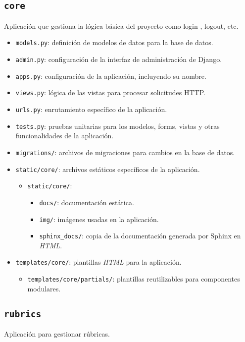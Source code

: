 \subsection{\texttt{core}}
Aplicación que gestiona la lógica básica del proyecto como login , logout, etc. 

\begin{itemize}
    \item \texttt{models.py}: definición de modelos de datos para la base de datos.
    \item \texttt{admin.py}: configuración de la interfaz de administración de Django.
    \item \texttt{apps.py}: configuración de la aplicación, incluyendo su nombre.
    \item \texttt{views.py}: lógica de las vistas para procesar solicitudes HTTP.
    \item \texttt{urls.py}: enrutamiento específico de la aplicación.
    \item \texttt{tests.py}: pruebas unitarias para los modelos, forms, vistas y otras funcionalidades de la aplicación.
    \item \texttt{migrations/}: archivos de migraciones para cambios en la base de datos.
    \item \texttt{static/core/}: archivos estáticos específicos de la aplicación.
    \begin{itemize}
        \item \texttt{static/core/}:
        \begin{itemize}
            \item \texttt{docs/}: documentación estática.
            \item \texttt{img/}: imágenes usadas en la aplicación.
            \item \texttt{sphinx\_docs/}: copia de la documentación generada por Sphinx en \textit{HTML}.
        \end{itemize}
    \end{itemize}
    \item \texttt{templates/core/}: plantillas \textit{HTML} para la aplicación.
    \begin{itemize}
        \item \texttt{templates/core/partials/}: plantillas reutilizables para componentes modulares.
    \end{itemize}
\end{itemize}

\subsection{\texttt{rubrics}}
Aplicación para gestionar rúbricas.

